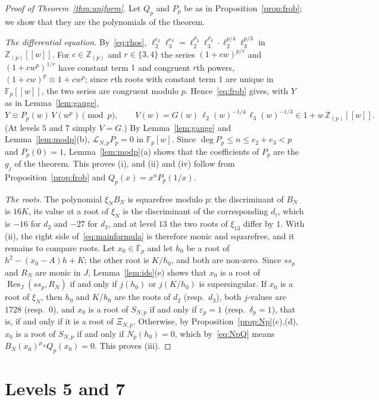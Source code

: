\documentclass[11pt,a4paper]{article}
\theoremstyle{definition}
\theoremstyle{remark}
\newcommand{\F}{\mathbb{F}}
\newcommand{\Z}{\mathbb{Z}}
\newcommand{\Fpbar}{\overline{\F}_p}
\newcommand{\Res}{\operatorname{Res}}
\newcommand{\ssp}{\mathit{ss}_p}
\newcommand{\Zp}{\Z_{(p)}}
\newcommand{\cL}{\mathcal{L}}
\numberwithin{equation}{section}
\begin{document}
\begin{proof}[Proof of Theorem~\ref{thm:uniform}]
Let $Q_p$ and $P_p$ be as in Proposition~\ref{prop:frob}; we show that they
are the polynomials of the theorem.

\emph{The differential equation.} By~\eqref{eq:rhos},
$\ell_2^{e_2}\ell_3^{e_3}=\ell_2^{\rho_2}\ell_3^{\rho_3}\cdot\ell_2^{p/4}\ell_3^{p/3}$
in $\Zp[[w]]$. For $c\in\Zp$ and $r\in\{3,4\}$ the series $(1+cw)^{p/r}$ and
$(1+cw^p)^{1/r}$ have constant term $1$ and congruent $r$th powers,
$(1+cw)^p\equiv1+cw^p$; since $r$th roots with constant term $1$ are unique
in $\F_p[[w]]$, the two series are congruent modulo $p$. Hence~\eqref{eq:frob}
gives, with $Y$ as in Lemma~\ref{lem:gauge},
\[
Y\equiv P_p(w)\,V(w^p)\pmod p,\qquad
V(w)=G(w)\,\ell_2(w)^{-1/4}\,\ell_3(w)^{-1/3}\in1+w\,\Zp[[w]].
\]
(At levels $5$ and $7$ simply $V=G$.) By Lemma~\ref{lem:gauge} and
Lemma~\ref{lem:modp}(b), $\cL_{N,p}P_p=0$ in $\F_p[w]$. Since
$\deg P_p\le n\le e_2+e_3<p$ and $P_p(0)=1$, Lemma~\ref{lem:modp}(a) shows
that the coefficients of $P_p$ are the $g_j$ of the theorem. This proves (i),
and (ii) and (iv) follow from Proposition~\ref{prop:frob} and
$Q_p(x)=x^nP_p(1/x)$.

\emph{The roots.} The polynomial $\xi_NB_N$ is squarefree modulo $p$: the
discriminant of $B_N$ is $16K$, its value at a root of $\xi_N$ is the
discriminant of the corresponding $d_i$, which is $-16$ for $d_2$ and $-27$
for $d_3$, and at level $13$ the two roots of $\xi_{13}$ differ by $1$. With
(ii), the right side of~\eqref{eq:mainformula} is therefore monic and
squarefree, and it remains to compare roots. Let $x_0\in\Fpbar$ and let
$h_0$ be a root of $h^2-(x_0-A)h+K$; the other root is $K/h_0$, and both are
non-zero. Since $\ssp$ and $R_N$ are monic in $J$, Lemma~\ref{lem:ids}(e)
shows that $x_0$ is a root of $\Res_J(\ssp,R_N)$ if and only if $j(h_0)$ or
$j(K/h_0)$ is supersingular. If $x_0$ is a root of $\xi_N$, then $h_0$ and
$K/h_0$ are the roots of $d_2$ (resp.\ $d_3$), both $j$-values are $1728$
(resp.\ $0$), and $x_0$ is a root of $S_{N,p}$ if and only if
$\varepsilon_p=1$ (resp.\ $\delta_p=1$), that is, if and only if it is a root
of $\Xi_{N,p}$. Otherwise, by Proposition~\ref{prop:Np}(c),(d), $x_0$ is a root
of $S_{N,p}$ if and only if $\overline N_p(h_0)=0$, which by~\eqref{eq:NpQ}
means $B_N(x_0)^{\mu_N}Q_p(x_0)=0$. This proves (iii).
\end{proof}

\section{Levels 5 and 7}\label{sec:57}
\end{document}
